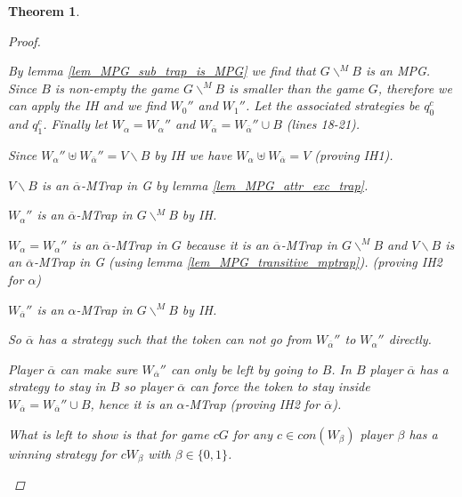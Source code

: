 \documentclass[]{article}
\newtheorem{theorem}{Theorem}[section]
\begin{document}
\begin{theorem}
\begin{proof}
\begin{itemize}
			By lemma \ref{lem_MPG_sub_trap_is_MPG} we find that $G\backslash^{\!\!M}B$ is an MPG. Since $B$ is non-empty the game $G\backslash^{\!\!M}B$ is smaller than the game $G$, therefore we can apply the IH and we find $W_0''$ and $W_1''$. Let the associated strategies be $q_0^c$ and $q_1^c$. Finally let $W_\alpha = W_\alpha''$ and $W_{\overline{\alpha}} = W_{\overline{\alpha}}'' \cup B$ (lines 18-21).
			
			Since $W_\alpha'' \uplus W_{\overline{\alpha}}'' = V\backslash B$ by IH we have $W_\alpha \uplus W_{\overline{\alpha}} = V$ (proving IH1).
			
			
			$V \backslash B$ is an $\overline{\alpha}$-MTrap in G by lemma \ref{lem_MPG_attr_exc_trap}.
			
			$W_\alpha''$ is an $\overline{\alpha}$-MTrap in $G\backslash^{\!\!M}B$ by IH.
			
			$W_\alpha = W_\alpha''$ is an $\overline{\alpha}$-MTrap in $G$ because it is an $\overline{\alpha}$-MTrap in $G\backslash^{\!\!M}B$ and $V \backslash B$ is an $\overline{\alpha}$-MTrap in G (using lemma \ref{lem_MPG_transitive_mptrap}). (proving IH2 for $\alpha$)
			
			$W_{\overline{\alpha}}''$ is an $\alpha$-MTrap in $G\backslash^{\!\!M}B$ by IH.
			
			So $\overline{\alpha}$ has a strategy such that the token can not go from $W_{\overline{\alpha}}''$ to $W_\alpha''$ directly.
			
			Player $\overline{\alpha}$ can make sure $W_{\overline{\alpha}}''$ can only be left by going to $B$. In $B$ player $\overline{\alpha}$ has a strategy to stay in $B$ so player $\overline{\alpha}$ can force the token to stay inside $W_{\overline{\alpha}} = W_{\overline{\alpha}}'' \cup B$, hence it is an $\alpha$-MTrap (proving IH2 for $\overline{\alpha}$).
			
			What is left to show is that for game $cG$ for any $c \in con(W_\beta)$ player $\beta$ has a winning strategy for $cW_\beta$ with $\beta \in \{0,1\}$.
			

\end{itemize}
\end{proof}
\end{theorem}
\end{document}
